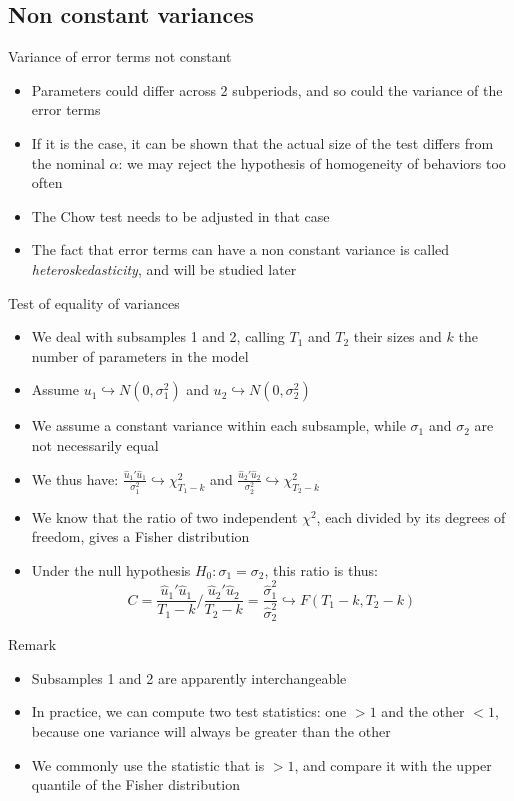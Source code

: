\documentclass[aspectratio=169]{beamer}
\begin{document}
\subsection{Non constant variances}

\begin{frame}{Variance of error terms not constant}
\begin{itemize}
    \item Parameters could differ across 2 subperiods, and so could the variance of the error terms
    \item If it is the case, it can be shown that the actual size of the test differs from the nominal $\alpha$: we may reject the hypothesis of homogeneity of behaviors too often
    \item The Chow test needs to be adjusted in that case
    \item The fact that error terms can have a non constant variance is called \textit{heteroskedasticity}, and will be studied later
\end{itemize}
\end{frame}

\begin{frame}{Test of equality of variances}
\begin{itemize}
    \item We deal with subsamples 1 and 2, calling $T_1$ and $T_2$ their sizes and $k$ the number of parameters in the model
    \item Assume $u_1 \hookrightarrow N(0, \sigma_1^2)$ and $u_2 \hookrightarrow N(0, \sigma_2^2)$
    \item We assume a constant variance within each subsample, while $\sigma_1$ and $\sigma_2$ are not necessarily equal
    \item We thus have: $\frac{\hat{u}_1'\hat{u}_1}{\sigma_1^2} \hookrightarrow \chi_{T_1-k}^2$ and $\frac{\hat{u}_2'\hat{u}_2}{\sigma_2^2} \hookrightarrow \chi_{T_2-k}^2$
    \item We know that the ratio of two independent $\chi^2$, each divided by its degrees of freedom, gives a Fisher distribution
    \item Under the null hypothesis $H_0: \sigma_1 = \sigma_2$, this ratio is thus:
    \[
    C = \frac{\hat{u}_1'\hat{u}_1}{T_1-k} / \frac{\hat{u}_2'\hat{u}_2}{T_2-k} = \frac{\hat{\sigma}_1^2}{\hat{\sigma}_2^2} \hookrightarrow F(T_1-k, T_2-k)
    \]
\end{itemize}
\end{frame}

\begin{frame}{Remark}
\begin{itemize}
    \item Subsamples 1 and 2 are apparently interchangeable
    \item In practice, we can compute two test statistics: one $> 1$ and the other $< 1$, because one variance will always be greater than the other
    \item We commonly use the statistic that is $> 1$, and compare it with the upper quantile of the Fisher distribution
\end{itemize}
\end{frame}
\end{document}
